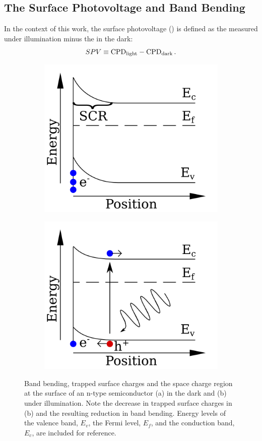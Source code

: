 \subsection{The Surface Photovoltage and Band Bending}
In the context of this work, the surface photovoltage (\spv{}) is defined as the \cpd{} measured under illumination minus the \cpd{} in the dark:
\begin{equation}
\label{spv}
	SPV \equiv \text{CPD}_{\text{light}} - \text{CPD}_{\text{dark}} \, .
\end{equation}
\begin{figure}
\begin{subfigure}{0.5\textwidth}
\centering
	\includegraphics[width=0.8\linewidth]{./figs/chap2/bb-dark}
	\caption{}
	\label{fig:bbdark}
\end{subfigure}
\begin{subfigure}{0.5\textwidth}
\centering
	\includegraphics[width=0.8\linewidth]{./figs/chap2/bb-light}
	\caption{}
	\label{fig:bblight}
\end{subfigure}
\caption{Band bending, trapped surface charges and the space charge region at the surface of an n-type semiconductor (a) in the dark and (b) under illumination. Note the decrease in trapped surface charges in (b) and the resulting reduction in band bending. Energy levels of the valence band, $E_v$, the Fermi level, $E_f$, and the conduction band, $E_c$, are included for reference.}
\label{fig:bb}
\end{figure}
